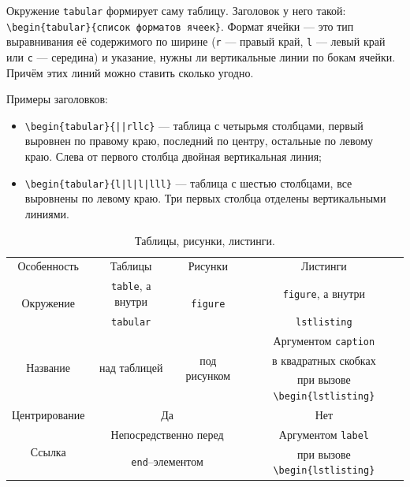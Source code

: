 \documentclass[14pt,russian]{scrartcl}
\begin{document}
Окружение \texttt{tabular} формирует саму таблицу. Заголовок у него такой: \texttt{\textbackslash begin\{tabular\}\{список форматов ячеек\}}. Формат ячейки --- это тип выравнивания её содержимого по ширине (\texttt{r} --- правый край, \texttt{l} --- левый край или \texttt{c} --- середина) и указание, нужны ли вертикальные линии по бокам ячейки. Причём этих линий можно ставить сколько угодно.

Примеры заголовков:
\begin{itemize}
\item \texttt{\textbackslash begin\{tabular\}\{||rllc\}} --- таблица с четырьмя столбцами, первый выровнен по правому краю, последний по центру, остальные по левому краю. Слева от первого столбца двойная вертикальная линия;
\item \texttt{\textbackslash begin\{tabular\}\{l|l|l|lll\}} --- таблица с шестью столбцами, все выровнены по левому краю. Три первых столбца отделены вертикальными линиями.
\end{itemize}

\bigskip

\begin{table}[htb]
\caption{\centering Таблицы, рисунки, листинги.}

\centering\begin{tabular}{|||c|c|c|c||}
\hline\hline
\multirow{ 2}{*}{Особенность} & \multirow{ 2}{*}{Таблицы} & \multirow{ 2}{*}{Рисунки} & \multirow{ 2}{*}{Листинги}\\
& & & \\
\hline
\multirow{ 2}{*}{Окружение} & {\texttt{table}, а внутри}  & \multirow{ 2}{*}{\texttt{figure}} & \texttt{figure}, а внутри \\
&\texttt{tabular} & & \texttt{lstlisting}\\\hline
\multirow{ 3}{*}{Название} & \multirow{ 3}{*}{над таблицей}  & \multirow{ 3}{*}{под рисунком}  & {Аргументом \texttt{caption}}\\
&  &  &  в квадратных скобках \\
& & &{при вызове \texttt{\textbackslash begin\{lstlisting\}}}\\\hline
Центрирование &\multicolumn{2}{c|}{Да} & Нет \\\hline
\multirow{2}{*}{Ссылка} &\multicolumn{2}{c|}{Непосредственно перед} & Аргументом \texttt{label} \\
&\multicolumn{2}{c|}{\texttt{end}--элементом} & {при вызове \texttt{\textbackslash begin\{lstlisting\}}}\\
\hline\hline
\end{tabular}
\label{table:table}
\end{table}
\end{document}
